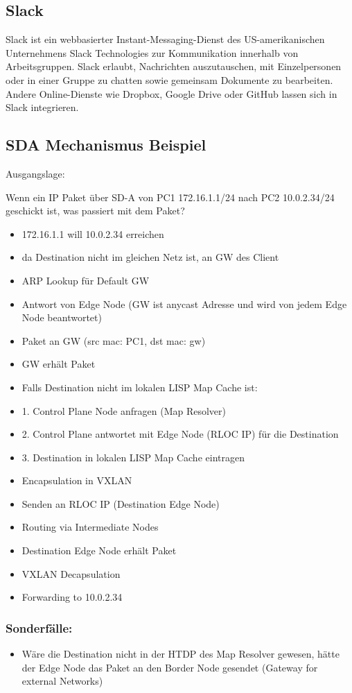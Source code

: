 \subsection{Slack}
Slack ist ein webbasierter Instant-Messaging-Dienst des US-amerikanischen Unternehmens Slack Technologies zur Kommunikation innerhalb von Arbeitsgruppen. Slack erlaubt, Nachrichten auszutauschen, mit Einzelpersonen oder in einer Gruppe zu chatten sowie gemeinsam Dokumente zu bearbeiten. Andere Online-Dienste wie Dropbox, Google Drive oder GitHub lassen sich in Slack integrieren.

\subsection{SDA Mechanismus Beispiel}

Ausgangslage:

Wenn ein IP Paket über SD-A von PC1 172.16.1.1/24 nach PC2 10.0.2.34/24 geschickt ist, was passiert mit dem Paket?

\begin{itemize}
	\item 172.16.1.1 will 10.0.2.34 erreichen
	\item da Destination nicht im gleichen Netz ist, an GW des Client
	\item ARP Lookup für Default GW
	\item Antwort von Edge Node (GW ist anycast Adresse und wird von jedem Edge Node beantwortet)
	\item Paket an GW (src mac: PC1, dst mac: gw)
	\item GW erhält Paket
	\item Falls Destination nicht im lokalen LISP Map Cache ist:
	\item    1. Control Plane Node anfragen (Map Resolver)
	\item    2. Control Plane antwortet mit Edge Node (RLOC IP) für die Destination
	\item    3. Destination in lokalen LISP Map Cache eintragen
	\item Encapsulation in VXLAN
	\item Senden an RLOC IP (Destination Edge Node)
	\item Routing via Intermediate Nodes
	\item Destination Edge Node erhält Paket
	\item VXLAN Decapsulation
	\item Forwarding to 10.0.2.34
	
\end{itemize}

\subsubsection{Sonderfälle:}
\begin{itemize}
	\item  Wäre die Destination nicht in der HTDP des Map Resolver gewesen, hätte der Edge Node das Paket an den Border Node gesendet (Gateway for external Networks)
\end{itemize}


